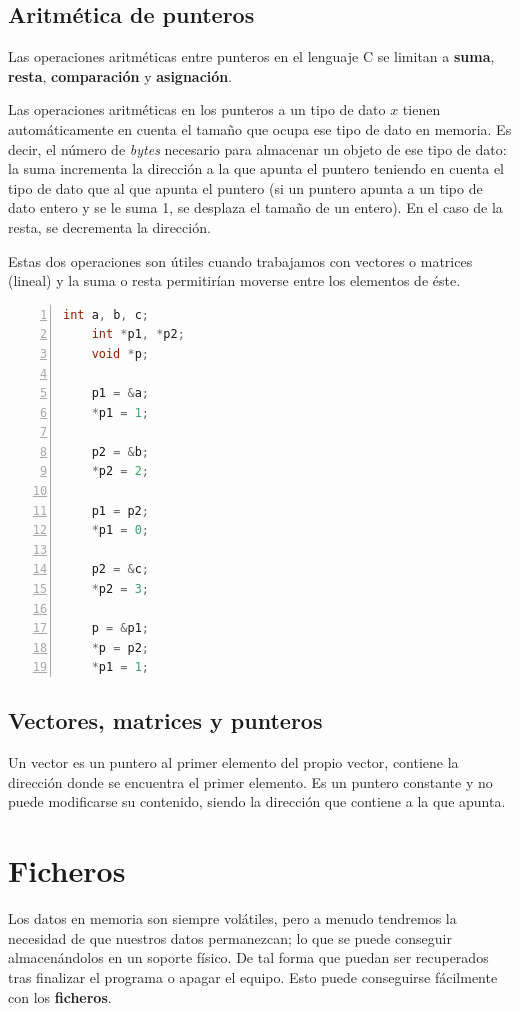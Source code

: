 \documentclass[a4paper, 11pt, titlepage]{article}
\begin{document}
    \subsection{Aritmética de punteros}

    Las operaciones aritméticas entre punteros en el lenguaje C se limitan a \textbf{suma}, 
    \textbf{resta}, \textbf{comparación} y \textbf{asignación}.

    Las operaciones aritméticas en los punteros a un tipo de dato $x$ tienen automáticamente en 
    cuenta el tamaño que ocupa ese tipo de dato en memoria. Es decir, el número de \textit{bytes}
    necesario para almacenar un objeto de ese tipo de dato: la suma incrementa la dirección a 
    la que apunta el puntero teniendo en cuenta el tipo de dato que al que apunta el puntero (si 
    un puntero apunta a un tipo de dato entero y se le suma 1, se desplaza el tamaño de un entero).
    En el caso de la resta, se decrementa la dirección.

    Estas dos operaciones son útiles cuando trabajamos con vectores o matrices (lineal) y la suma
    o resta permitirían moverse entre los elementos de éste.

    \begin{lstlisting}[language=C,numbers=left]
    int a, b, c;
    int *p1, *p2;
    void *p;

    p1 = &a;
    *p1 = 1;

    p2 = &b;
    *p2 = 2;

    p1 = p2;
    *p1 = 0;

    p2 = &c;
    *p2 = 3;

    p = &p1;
    *p = p2;
    *p1 = 1;\end{lstlisting}

    \subsection{Vectores, matrices y punteros}

    Un vector es un puntero al primer elemento del propio vector, contiene la dirección donde
    se encuentra el primer elemento. Es un puntero constante y no puede modificarse su 
    contenido, siendo la dirección que contiene a la que apunta.

\section{Ficheros}

    Los datos en memoria son siempre volátiles, pero a menudo tendremos la necesidad de que nuestros 
    datos permanezcan; lo que se puede conseguir almacenándolos en un soporte físico. De tal forma que 
    puedan ser recuperados tras finalizar el programa o apagar el equipo. Esto puede conseguirse 
    fácilmente con los \textbf{ficheros}.
\end{document}
